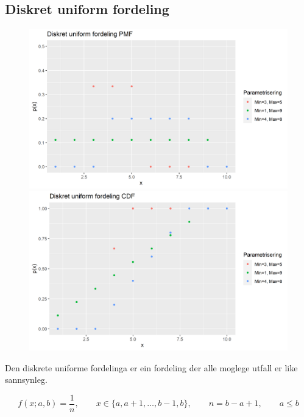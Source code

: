 \subsection{Diskret uniform fordeling}
\begin{figure}[H]
  \centering
  \begin{minipage}[b]{0.49\textwidth}
    \includegraphics[width=\textwidth]{bilete/diskretuniformpmf.png}
  \end{minipage}
  \hfill
  \begin{minipage}[b]{0.49\textwidth}
    \includegraphics[width=\textwidth]{bilete/diskretuniformcdf.png}
  \end{minipage}
\end{figure}

Den diskrete uniforme fordelinga er ein fordeling der alle moglege utfall er like sannsynleg.

\begin{equation}
    f(x; a, b) = \frac{1}{n}, \qquad x \in \{a, a+1, \dots, b-1, b\}, \qquad n = b - a + 1, \qquad a \leq b
\end{equation}

